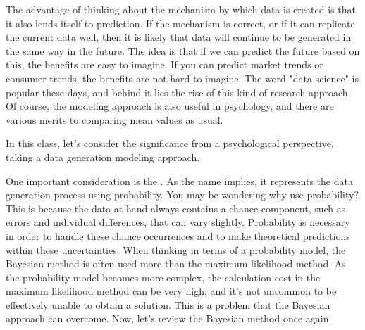 \documentclass{ltjsbook}
\begin{document}
The advantage of thinking about the mechanism by which data is created is that it also lends itself to prediction. If the mechanism is correct, or if it can replicate the current data well, then it is likely that data will continue to be generated in the same way in the future. The idea is that if we can predict the future based on this, the benefits are easy to imagine. If you can predict market trends or consumer trends, the benefits are not hard to imagine. The word "data science" is popular these days, and behind it lies the rise of this kind of research approach. Of course, the modeling approach is also useful in psychology, and there are various merits to comparing mean values as usual.

In this class, let's consider the significance from a psychological perspective, taking a data generation modeling approach.

One important consideration is the . As the name implies, it represents the data generation process using probability. You may be wondering why use probability? This is because the data at hand always contains a chance component, such as errors and individual differences, that can vary slightly. Probability is necessary in order to handle these chance occurrences and to make theoretical predictions within these uncertainties. When thinking in terms of a probability model, the Bayesian method is often used more than the maximum likelihood method. As the probability model becomes more complex, the calculation cost in the maximum likelihood method can be very high, and it's not uncommon to be effectively unable to obtain a solution. This is a problem that the Bayesian approach can overcome. Now, let's review the Bayesian method once again.
\end{document}
